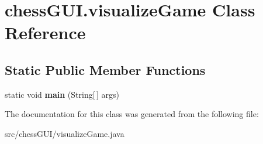 \hypertarget{classchess_g_u_i_1_1visualize_game}{}\section{chess\+G\+U\+I.\+visualize\+Game Class Reference}
\label{classchess_g_u_i_1_1visualize_game}
\subsection*{Static Public Member Functions}
\begin{DoxyCompactItemize}
\item 
\mbox{\label{classchess_g_u_i_1_1visualize_game_a43d572719c68b08624c43d4178a9b9fa}} 
static void {\bfseries main} (String\mbox{[}$\,$\mbox{]} args)
\end{DoxyCompactItemize}


The documentation for this class was generated from the following file\+:\begin{DoxyCompactItemize}
\item 
src/chess\+G\+U\+I/visualize\+Game.\+java\end{DoxyCompactItemize}
